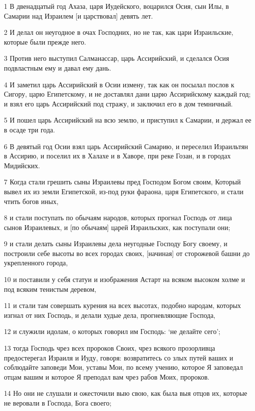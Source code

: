 \par 1 В двенадцатый год Ахаза, царя Иудейского, воцарился Осия, сын Илы, в Самарии над Израилем [и царствовал] девять лет.
\par 2 И делал он неугодное в очах Господних, но не так, как цари Израильские, которые были прежде него.
\par 3 Против него выступил Салманассар, царь Ассирийский, и сделался Осия подвластным ему и давал ему дань.
\par 4 И заметил царь Ассирийский в Осии измену, так как он посылал послов к Сигору, царю Египетскому, и не доставлял дани царю Ассирийскому каждый год; и взял его царь Ассирийский под стражу, и заключил его в дом темничный.
\par 5 И пошел царь Ассирийский на всю землю, и приступил к Самарии, и держал ее в осаде три года.
\par 6 В девятый год Осии взял царь Ассирийский Самарию, и переселил Израильтян в Ассирию, и поселил их в Халахе и в Хаворе, при реке Гозан, и в городах Мидийских.
\par 7 Когда стали грешить сыны Израилевы пред Господом Богом своим, Который вывел их из земли Египетской, из-под руки фараона, царя Египетского, и стали чтить богов иных,
\par 8 и стали поступать по обычаям народов, которых прогнал Господь от лица сынов Израилевых, и [по обычаям] царей Израильских, как поступали они;
\par 9 и стали делать сыны Израилевы дела неугодные Господу Богу своему, и построили себе высоты во всех городах своих, [начиная] от сторожевой башни до укрепленного города,
\par 10 и поставили у себя статуи и изображения Астарт на всяком высоком холме и под всяким тенистым деревом,
\par 11 и стали там совершать курения на всех высотах, подобно народам, которых изгнал от них Господь, и делали худые дела, прогневляющие Господа,
\par 12 и служили идолам, о которых говорил им Господь: `не делайте сего';
\par 13 тогда Господь чрез всех пророков Своих, чрез всякого прозорливца предостерегал Израиля и Иуду, говоря: возвратитесь со злых путей ваших и соблюдайте заповеди Мои, уставы Мои, по всему учению, которое Я заповедал отцам вашим и которое Я преподал вам чрез рабов Моих, пророков.
\par 14 Но они не слушали и ожесточили выю свою, как была выя отцов их, которые не веровали в Господа, Бога своего;
